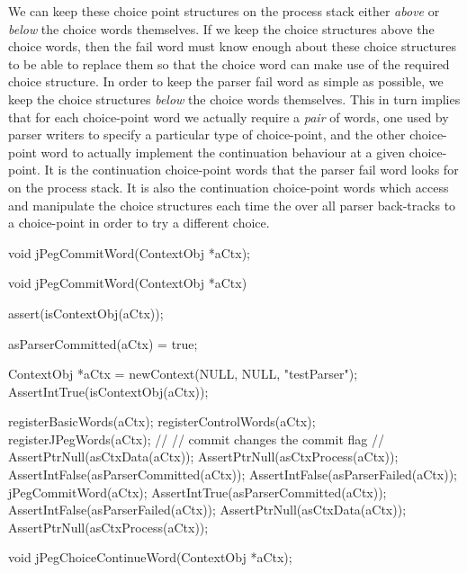 We can keep these choice point structures on the process stack either 
\emph{above} or \emph{below} the choice words themselves. If we keep the 
choice structures above the choice words, then the fail word must know 
enough about these choice structures to be able to replace them so that 
the choice word can make use of the required choice structure. In order to 
keep the parser fail word as simple as possible, we keep the choice 
structures \emph{below} the choice words themselves. This in turn implies 
that for each choice-point word we actually require a \emph{pair} of 
words, one used by parser writers to specify a particular type of 
choice-point, and the other  choice-point word to 
actually implement the continuation behaviour at a given choice-point. It 
is the continuation choice-point words that the parser fail word looks for 
on the process stack. It is also the continuation choice-point words which 
access and manipulate the choice structures each time the over all parser 
back-tracks to a choice-point in order to try a different choice. 

\startTestSuite[jPegCommitWord]

\startCHeader
void jPegCommitWord(ContextObj *aCtx);
\stopCHeader

\startCCode
void jPegCommitWord(ContextObj *aCtx) {
  assert(isContextObj(aCtx));
  
  asParserCommitted(aCtx) = true;
}
\stopCCode


\startCTest
  ContextObj *aCtx = newContext(NULL, NULL, "testParser");
  AssertIntTrue(isContextObj(aCtx));
  
  registerBasicWords(aCtx);
  registerControlWords(aCtx);
  registerJPegWords(aCtx);
  //
  // commit changes the commit flag
  //
  AssertPtrNull(asCtxData(aCtx));
  AssertPtrNull(asCtxProcess(aCtx));
  AssertIntFalse(asParserCommitted(aCtx));
  AssertIntFalse(asParserFailed(aCtx));
  jPegCommitWord(aCtx);
  AssertIntTrue(asParserCommitted(aCtx));
  AssertIntFalse(asParserFailed(aCtx));
  AssertPtrNull(asCtxData(aCtx));
  AssertPtrNull(asCtxProcess(aCtx));
\stopCTest
\stopTestCase
\stopTestSuite

\startTestSuite[jPegChoiceContinueWord]

\startCHeader
void jPegChoiceContinueWord(ContextObj *aCtx);
\stopCHeader

